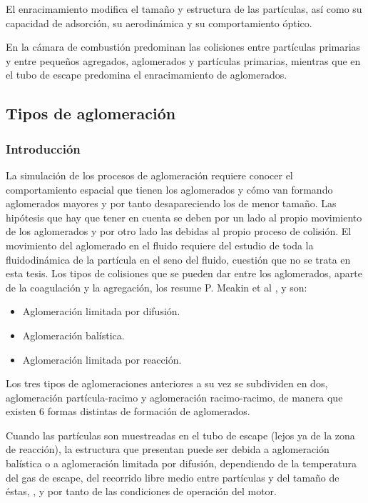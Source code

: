 \par El enracimamiento modifica el tamaño y estructura de las partículas, así como su capacidad de adsorción, su aerodinámica y su comportamiento óptico.	
\par En la cámara de combustión predominan las colisiones entre partículas primarias y entre pequeños agregados, aglomerados y partículas primarias, mientras que en el tubo de escape predomina el enracimamiento de aglomerados.
 
\subsection{Tipos de aglomeración}\label{sub:tiposaglomeracion}
\subsubsection{Introducción}

\par La simulación de los procesos de aglomeración requiere conocer el comportamiento espacial que tienen los aglomerados y cómo van formando aglomerados mayores y por tanto desapareciendo los de menor tamaño. Las hipótesis que hay que tener en cuenta se deben por un lado al propio movimiento de los aglomerados y por otro lado las debidas al propio proceso de colisión. El movimiento del aglomerado en el fluido requiere del estudio de toda la fluidodinámica de la partícula en el seno del fluido, cuestión que no se trata en esta tesis. Los tipos de colisiones que se pueden dar entre los aglomerados, aparte de la coagulación y la agregación, los resume P. Meakin et al \cite{meakinetal:1989}, y son:

\begin{itemize}
\item Aglomeración limitada por difusión.
\item Aglomeración balística.
\item Aglomeración limitada por reacción.
\end{itemize}

\par Los tres tipos de aglomeraciones anteriores a su vez se subdividen en dos, aglomeración partícula-racimo y aglomeración racimo-racimo, de manera que existen 6 formas distintas de formación de aglomerados.

\par Cuando las partículas son muestreadas en el tubo de escape (lejos ya de la zona de reacción), la estructura que presentan puede ser debida a aglomeración balística o a aglomeración limitada por difusión, dependiendo de la temperatura del gas de escape, del recorrido libre medio entre partículas y del tamaño de éstas, \cite{skillasetal:1998}, y por tanto de las condiciones de operación del motor.


